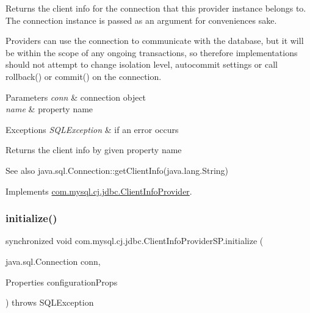Returns the client info for the connection that this provider instance belongs to. The connection instance is passed as an argument for convenience\textquotesingle{}s sake.

Providers can use the connection to communicate with the database, but it will be within the scope of any ongoing transactions, so therefore implementations should not attempt to change isolation level, autocommit settings or call rollback() or commit() on the connection.


\begin{DoxyParams}{Parameters}
{\em conn} & connection object \\
\hline
{\em name} & property name \\
\hline
\end{DoxyParams}

\begin{DoxyExceptions}{Exceptions}
{\em S\+Q\+L\+Exception} & if an error occurs \\
\hline
\end{DoxyExceptions}
\begin{DoxyReturn}{Returns}
the client info by given property name 
\end{DoxyReturn}
\begin{DoxySeeAlso}{See also}
java.\+sql.\+Connection\+::get\+Client\+Info(java.\+lang.\+String) 
\end{DoxySeeAlso}


Implements \mbox{\hyperlink{interfacecom_1_1mysql_1_1cj_1_1jdbc_1_1_client_info_provider_a0447982e2a9eeec5776288384f7db3c1}{com.\+mysql.\+cj.\+jdbc.\+Client\+Info\+Provider}}.

\mbox{\label{classcom_1_1mysql_1_1cj_1_1jdbc_1_1_client_info_provider_s_p_a39331800ea481417eab7170b3a878af5}} 
\subsubsection{\texorpdfstring{initialize()}{initialize()}}
{\footnotesize\ttfamily synchronized void com.\+mysql.\+cj.\+jdbc.\+Client\+Info\+Provider\+S\+P.\+initialize (\begin{DoxyParamCaption}\item[{java.\+sql.\+Connection}]{conn,  }\item[{Properties}]{configuration\+Props }\end{DoxyParamCaption}) throws S\+Q\+L\+Exception}

